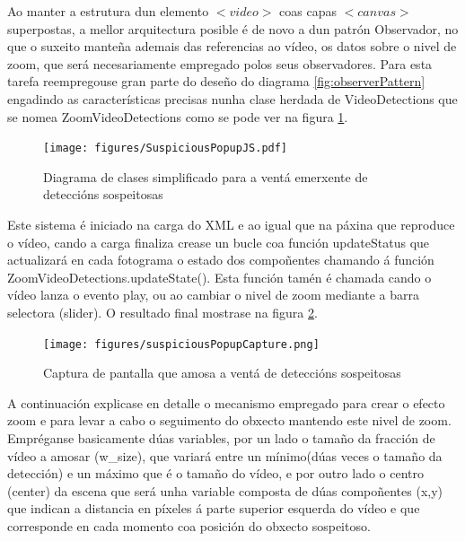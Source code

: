         Ao manter a estrutura dun elemento $<video>$ coas capas $<canvas>$ superpostas, a mellor 
        arquitectura posible é de novo a dun patrón Observador, no que o suxeito manteña ademais das referencias
        ao vídeo, os datos sobre o nivel de zoom, que será necesariamente empregado polos seus 
        observadores. Para esta tarefa reempregouse gran parte do deseño do diagrama \ref{fig:observerPattern}
        engadindo as características precisas nunha clase herdada de VideoDetections que se nomea 
        ZoomVideoDetections como se pode ver na figura \ref{fig:SuspiciousPopupJS}.
        
        \begin{figure}[htp]
        \begin{center}
            \texttt{[image: figures/SuspiciousPopupJS.pdf]}
            \caption{Diagrama de clases simplificado para a ventá emerxente de deteccións sospeitosas}
        \label{fig:SuspiciousPopupJS}
        \end{center}
        \end{figure} 
        
        Este sistema é iniciado na carga do XML e ao igual que na páxina que reproduce o vídeo, cando a 
        carga finaliza crease
        un bucle coa función updateStatus que actualizará en cada fotograma o estado dos compoñentes 
        chamando á función ZoomVideoDetections.updateState(). Esta función tamén é chamada cando o vídeo
        lanza o evento play, ou ao cambiar o nivel de zoom mediante a barra selectora (slider).
        O resultado final mostrase na figura \ref{fig:suspiciousPopupCapture}.

        \begin{figure}[htp]
        \begin{center}
            \texttt{[image: figures/suspiciousPopupCapture.png]}
            \caption{Captura de pantalla que amosa a ventá de deteccións sospeitosas}
        \label{fig:suspiciousPopupCapture}
        \end{center}
        \end{figure} 
        
        A continuación explicase en detalle o mecanismo empregado para crear o efecto zoom e para 
        levar a cabo o seguimento do obxecto mantendo este nivel de zoom. Empréganse 
        basicamente dúas variables, por un lado o tamaño da fracción de vídeo a amosar (w\_size), que
        variará entre un mínimo(dúas veces o tamaño da detección) e un máximo que é o tamaño do vídeo, 
        e por outro lado o centro (center) da escena que será unha variable composta de dúas 
        compoñentes (x,y) que indican a distancia en píxeles á parte superior esquerda do vídeo e 
        que corresponde en cada momento coa posición do obxecto sospeitoso.
        
